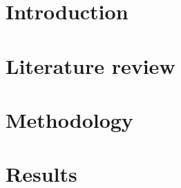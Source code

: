 \documentclass[12pt,a4paper]{article}
\begin{document}




\newpage



\tableofcontents
{}
\newpage
\setcounter{page}{1}

\section{Introduction}\label{sec:intro}

\lipsum[1-2]

\section{Literature review}\label{sec:lit-rev}

\lipsum[3-4]\cite{einstein}

\section{Methodology}\label{sec:meth}

\lipsum[5-6]\cite{latexcompanion}

\section{Results}\label{sec:res}

\lipsum[7-8]\cite{knuthwebsite}



\end{document}
